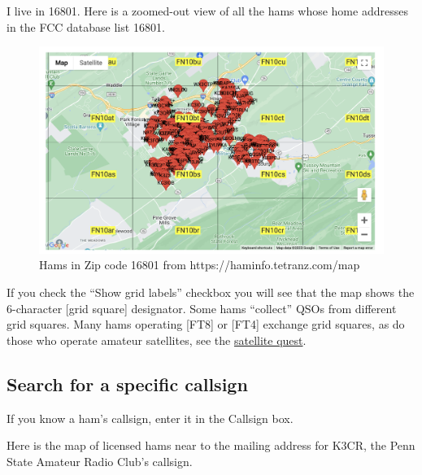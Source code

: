 \documentclass[
  letterpaper,
  DIV=11,
  numbers=noendperiod]{scrreport}
\begin{document}
I live in 16801. Here is a zoomed-out view of all the hams whose home
addresses in the FCC database list 16801.

\begin{figure}

{\centering \includegraphics[width=1\textwidth,height=\textheight]{include/img/hams-in-16801.png}

}

\caption{Hams in Zip code 16801 from https://haminfo.tetranz.com/map}

\end{figure}

If you check the ``Show grid labels'' checkbox you will see that the map
shows the 6-character {[}grid square{]} designator. Some hams
``collect'' QSOs from different grid squares. Many hams operating
{[}FT8{]} or {[}FT4{]} exchange grid squares, as do those who operate
amateur satellites, see the
\protect\hyperlink{quest-satellites}{satellite quest}.

\hypertarget{search-for-a-specific-callsign}{%
\subsection*{Search for a specific
callsign}\label{search-for-a-specific-callsign}}

If you know a ham's callsign, enter it in the Callsign box.

Here is the map of licensed hams near to the mailing address for K3CR,
the Penn State Amateur Radio Club's callsign.
\end{document}
